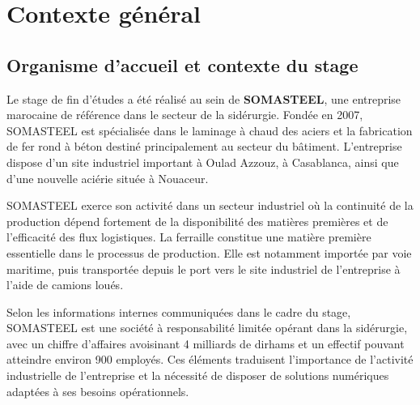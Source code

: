 \chapter{Contexte général}



\section{Organisme d'accueil et contexte du stage}

Le stage de fin d'études a été réalisé au sein de \textbf{SOMASTEEL}, une entreprise marocaine de référence dans le secteur de la sidérurgie. Fondée en 2007, SOMASTEEL est spécialisée dans le laminage à chaud des aciers et la fabrication de fer rond à béton destiné principalement au secteur du bâtiment. L'entreprise dispose d'un site industriel important à Oulad Azzouz, à Casablanca, ainsi que d'une nouvelle aciérie située à Nouaceur.

SOMASTEEL exerce son activité dans un secteur industriel où la continuité de la production dépend fortement de la disponibilité des matières premières et de l'efficacité des flux logistiques. La ferraille constitue une matière première essentielle dans le processus de production. Elle est notamment importée par voie maritime, puis transportée depuis le port vers le site industriel de l'entreprise à l'aide de camions loués.

Selon les informations internes communiquées dans le cadre du stage, SOMASTEEL est une société à responsabilité limitée opérant dans la sidérurgie, avec un chiffre d'affaires avoisinant 4 milliards de dirhams et un effectif pouvant atteindre environ 900 employés. Ces éléments traduisent l'importance de l'activité industrielle de l'entreprise et la nécessité de disposer de solutions numériques adaptées à ses besoins opérationnels.

